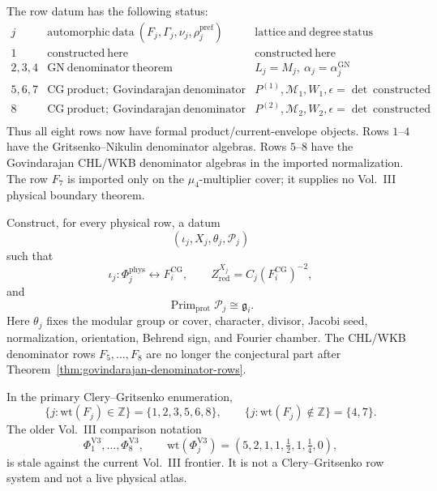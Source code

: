 \documentclass[11pt]{memoir}
\newcommand{\Z}{\mathbb{Z}} \newcommand{\C}{\mathbb{C}}
\newcommand{\Prim}{\operatorname{Prim}}
\begin{document}
\begin{remark}
\label{prop:no-unbuilt-denominator}
The row datum has the following status:
$$
\begin{array}{c|c|c}
j&\mathrm{automorphic\ data}\ (F_j,\Gamma_j,\nu_j,\rho_j^{\mathrm{pref}})
&\mathrm{lattice\ and\ degree\ status}\\ \hline
1&\mathrm{constructed\ here}&\mathrm{constructed\ here}\\
2,3,4&\mathrm{GN\ denominator\ theorem}
&L_j=M_j,\ \alpha_j=\alpha_j^{\mathrm{GN}}\\
5,6,7&\mathrm{CG\ product;\ Govindarajan\ denominator}
&P^{(1)},\mathcal M_1,W_1,\epsilon=\det\ \mathrm{constructed}\\
8&\mathrm{CG\ product;\ Govindarajan\ denominator}
&P^{(2)},\mathcal M_2,W_2,\epsilon=\det\ \mathrm{constructed}\\
\end{array}
$$
Thus all eight rows now have formal product/current-envelope objects.
Rows \(1\)--\(4\) have the Gritsenko--Nikulin denominator algebras.
Rows \(5\)--\(8\) have the Govindarajan CHL/WKB denominator algebras in
the imported normalization.  The row \(F_7\) is imported only on the
\(\mu_4\)-multiplier cover; it supplies no Vol.~III physical boundary
theorem.
\end{remark}

\begin{openproblem}
\label{conj:nonabelian-row-extension}
Construct, for every physical row, a datum
$$
(\iota_j,X_j,\theta_j,\mathcal P_j)
$$
such that
$$
\iota_j:\Phi^{\mathrm{phys}}_j\longleftrightarrow F_i^{\mathrm{CG}},
\qquad
Z^{X_j}_{\mathrm{red}}=C_j(F_i^{\mathrm{CG}})^{-2},
$$
and
$$
\Prim_{\mathrm{prot}}\mathcal P_j\cong\mathfrak g_i.
$$
Here \(\theta_j\) fixes the modular group or cover, character, divisor,
Jacobi seed, normalization, orientation, Behrend sign, and Fourier
chamber.  The CHL/WKB denominator rows \(F_5,\ldots,F_8\) are no longer
the conjectural part after
Theorem~\ref{thm:govindarajan-denominator-rows}.
\end{openproblem}

\begin{proposition}
\label{prop:boundary-scope}
In the primary Clery--Gritsenko enumeration,
$$
\{j:\mathrm{wt}(F_j)\in\Z\}=\{1,2,3,5,6,8\},\qquad
\{j:\mathrm{wt}(F_j)\notin\Z\}=\{4,7\}.
$$
The older Vol.~III comparison notation
$$\Phi^{\mathrm{V3}}_1,\ldots,\Phi^{\mathrm{V3}}_8,\qquad
\mathrm{wt}(\Phi^{\mathrm{V3}}_j)=(5,2,1,1,\tfrac12,1,\tfrac14,0),$$
is stale against the current Vol.~III frontier.  It is not a
Clery--Gritsenko row system and not a live physical atlas.
\end{proposition}
\end{document}
